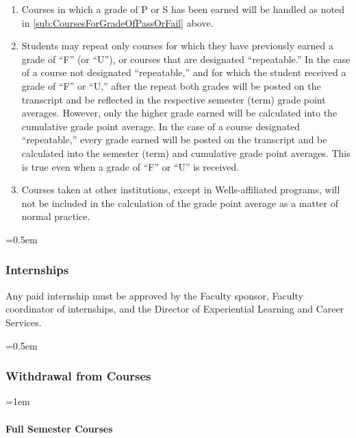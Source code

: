 \documentclass{manual}
\newcommand{\modified}[1]{}
\let\oldsubsubsection\subsubsection
\renewcommand\subsubsection{\leftskip=0.5em\oldsubsubsection}
\let\oldparagraph\paragraph
\renewcommand\paragraph{\leftskip=1em\oldparagraph}
\begin{document}
\begin{enumerate}[label=\arabic*]
\item Courses in which a grade of P or S has been earned will be handled as noted in \cref{sub:CoursesForGradeOfPassOrFail} above.

\item Students may repeat only courses for which they have previously earned a grade\modified{4/8/03}  of ``F'' (or ``U''), or courses that are designated ``repeatable.'' In the case of a course not designated ``repeatable,'' and for which the student received a grade of ``F'' or ``U,'' after the repeat both grades will be posted on the transcript and be reflected in the respective semester (term) grade point averages. However, only the higher grade earned will be calculated into the cumulative grade point average. In the case of a course designated ``repeatable,'' every grade earned will be posted on the transcript and be calculated into the semester (term) and cumulative grade point averages. This is true even when a grade of ``F'' or ``U'' is received.

\item Courses taken at other institutions, except in Wells-affiliated programs, will not be included in the calculation of the grade point average as a matter of normal practice.

\end{enumerate}

\subsubsection{Internships}\modified{5/13/93}

Any paid internship must be approved by the Faculty sponsor, Faculty coordinator of internships, and the Director of Experiential Learning and Career Services.

\subsubsection{Withdrawal from Courses}


\paragraph{Full Semester Courses}
\end{document}
